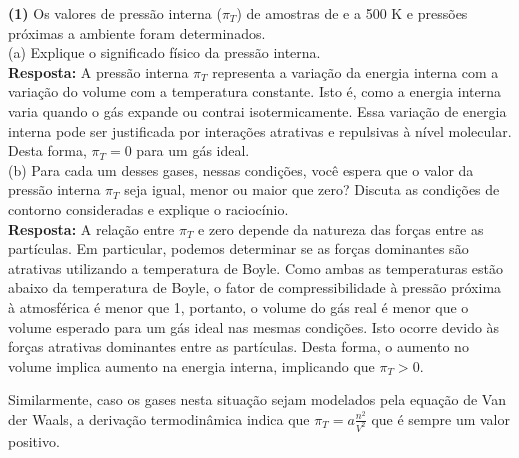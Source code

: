 \textbf{(1)} Os valores de pressão interna (\(\pi_T\)) de amostras de  e
 a 500 K e pressões próximas a ambiente foram determinados.\\

(a) Explique o significado físico da pressão interna.\\

\textbf{Resposta:}   A pressão interna \( \pi_T \) representa a variação da energia interna com a
   variação do volume com a temperatura constante. Isto é, como a energia
   interna varia quando o gás expande ou contrai isotermicamente. Essa variação
   de energia interna pode ser justificada por interações atrativas e repulsivas
   à nível molecular. Desta forma, \( \pi_T = 0 \) para um gás ideal.\\

(b) Para cada um desses gases, nessas condições, você espera que o valor da
pressão interna \(\pi_T\)  seja igual, menor ou maior que zero? Discuta as
condições de contorno consideradas e explique o raciocínio.\\

\textbf{Resposta:} A relação entre \( \pi_T \) e zero depende da natureza das
forças entre as partículas. Em particular, podemos determinar se as forças
dominantes são atrativas utilizando a temperatura de Boyle. Como ambas as
temperaturas estão abaixo da temperatura de Boyle, o fator de compressibilidade à
pressão próxima à atmosférica é menor que 1, portanto, o volume do gás real é
menor que o volume esperado para um gás ideal nas mesmas condições. Isto ocorre
devido às forças atrativas dominantes entre as partículas. Desta forma, o
aumento no volume implica aumento na energia interna, implicando que \( \pi_T >
0 \).

Similarmente, caso os gases nesta situação sejam modelados pela equação de Van
der Waals, a derivação termodinâmica indica que \( \pi_T = a \frac{n^2}{V^2} \)
que é sempre um valor positivo.
